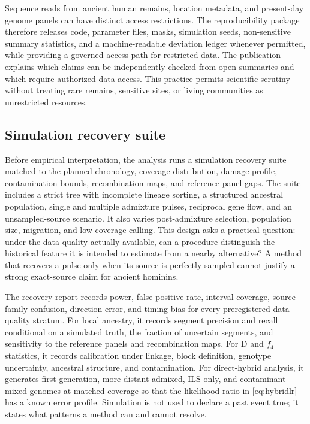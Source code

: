 \documentclass[conference]{IEEEtran}
\begin{document}
Sequence reads from ancient human remains, location metadata, and present-day genome panels can have distinct access restrictions. The reproducibility package therefore releases code, parameter files, masks, simulation seeds, non-sensitive summary statistics, and a machine-readable deviation ledger whenever permitted, while providing a governed access path for restricted data. The publication explains which claims can be independently checked from open summaries and which require authorized data access. This practice permits scientific scrutiny without treating rare remains, sensitive sites, or living communities as unrestricted resources.

\subsection{Simulation recovery suite}

Before empirical interpretation, the analysis runs a simulation recovery suite matched to the planned chronology, coverage distribution, damage profile, contamination bounds, recombination maps, and reference-panel gaps. The suite includes a strict tree with incomplete lineage sorting, a structured ancestral population, single and multiple admixture pulses, reciprocal gene flow, and an unsampled-source scenario. It also varies post-admixture selection, population size, migration, and low-coverage calling. This design asks a practical question: under the data quality actually available, can a procedure distinguish the historical feature it is intended to estimate from a nearby alternative? A method that recovers a pulse only when its source is perfectly sampled cannot justify a strong exact-source claim for ancient hominins.

The recovery report records power, false-positive rate, interval coverage, source-family confusion, direction error, and timing bias for every preregistered data-quality stratum. For local ancestry, it records segment precision and recall conditional on a simulated truth, the fraction of uncertain segments, and sensitivity to the reference panels and recombination maps. For D and $f_4$ statistics, it records calibration under linkage, block definition, genotype uncertainty, ancestral structure, and contamination. For direct-hybrid analysis, it generates first-generation, more distant admixed, ILS-only, and contaminant-mixed genomes at matched coverage so that the likelihood ratio in \eqref{eq:hybridlr} has a known error profile. Simulation is not used to declare a past event true; it states what patterns a method can and cannot resolve.
\end{document}
